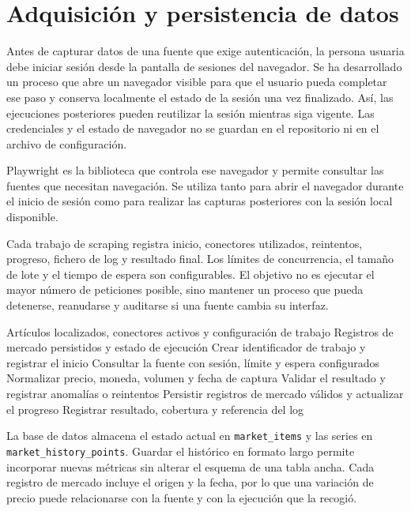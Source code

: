 \section{Adquisición y persistencia de datos}

Antes de capturar datos de una fuente que exige autenticación, la persona usuaria debe iniciar sesión desde la pantalla de sesiones del navegador. Se ha desarrollado un proceso que abre un navegador visible para que el usuario pueda completar ese paso y conserva localmente el estado de la sesión una vez finalizado. Así, las ejecuciones posteriores pueden reutilizar la sesión mientras siga vigente. Las credenciales y el estado de navegador no se guardan en el repositorio ni en el archivo de configuración.

Playwright \cite{microsoft2026playwright} es la biblioteca que controla ese navegador y permite consultar las fuentes que necesitan navegación. Se utiliza tanto para abrir el navegador durante el inicio de sesión como para realizar las capturas posteriores con la sesión local disponible.

Cada trabajo de scraping registra inicio, conectores utilizados, reintentos, progreso, fichero de log y resultado final. Los límites de concurrencia, el tamaño de lote y el tiempo de espera son configurables. El objetivo no es ejecutar el mayor número de peticiones posible, sino mantener un proceso que pueda detenerse, reanudarse y auditarse si una fuente cambia su interfaz.

\begin{algorithm}[H]
\caption{Flujo de scraping.}
\label{alg:scraping-trazable}
\begin{algorithmic}[1]
\Require Artículos localizados, conectores activos y configuración de trabajo
\Ensure Registros de mercado persistidos y estado de ejecución
\State Crear identificador de trabajo y registrar el inicio
    \State Consultar la fuente con sesión, límite y espera configurados
    \State Normalizar precio, moneda, volumen y fecha de captura
    \State Validar el resultado y registrar anomalías o reintentos
  \EndFor
  \State Persistir registros de mercado válidos y actualizar el progreso
\EndFor
\State Registrar resultado, cobertura y referencia del log
\end{algorithmic}
\end{algorithm}

La base de datos almacena el estado actual en \texttt{market\_items} y las series en \texttt{market\_history\_points}. Guardar el histórico en formato largo permite incorporar nuevas métricas sin alterar el esquema de una tabla ancha. Cada registro de mercado incluye el origen y la fecha, por lo que una variación de precio puede relacionarse con la fuente y con la ejecución que la recogió.

